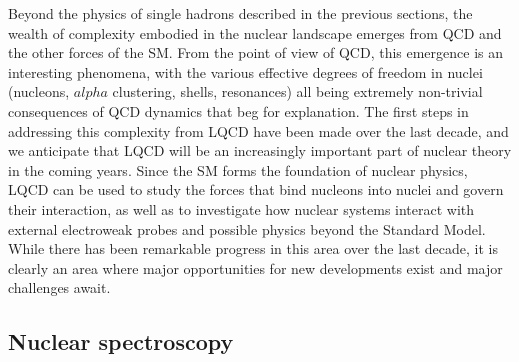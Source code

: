 
 Beyond the physics of single hadrons described in the previous sections, the wealth of complexity embodied in the nuclear landscape emerges from QCD and the other forces of the SM.  From the point of view of QCD, this emergence is an interesting phenomena, with the various effective degrees of freedom in nuclei (nucleons, $alpha$ clustering, shells, resonances) all being extremely non-trivial consequences of QCD dynamics that beg for explanation. The first steps in addressing this complexity from LQCD have been made over the last decade, and we anticipate that LQCD will be an increasingly important part of nuclear theory in the coming years. Since the SM forms the foundation of nuclear physics, LQCD can be used to study the forces that bind nucleons into nuclei and govern their interaction, as well as to investigate how nuclear systems interact with external electroweak probes and possible physics beyond the Standard Model.
While there has been remarkable progress in this area over the last decade, it is clearly an area where major opportunities for new developments exist and major challenges await.

\subsection{Nuclear spectroscopy}

